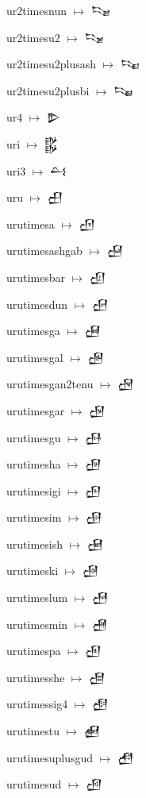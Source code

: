 {\noindent ur2timesnun $\mapsto$ {\cufont 𒌰}\par
\noindent ur2timesu2 $\mapsto$ {\cufont 𒌱}\par
\noindent ur2timesu2plusash $\mapsto$ {\cufont 𒌲}\par
\noindent ur2timesu2plusbi $\mapsto$ {\cufont 𒌳}\par
\noindent ur4 $\mapsto$ {\cufont 𒌴}\par
\noindent uri $\mapsto$ {\cufont 𒌵}\par
\noindent uri3 $\mapsto$ {\cufont 𒌶}\par
\noindent uru $\mapsto$ {\cufont 𒌷}\par
\noindent urutimesa $\mapsto$ {\cufont 𒌸}\par
\noindent urutimesashgab $\mapsto$ {\cufont 𒌹}\par
\noindent urutimesbar $\mapsto$ {\cufont 𒌺}\par
\noindent urutimesdun $\mapsto$ {\cufont 𒌻}\par
\noindent urutimesga $\mapsto$ {\cufont 𒌼}\par
\noindent urutimesgal $\mapsto$ {\cufont 𒌽}\par
\noindent urutimesgan2tenu $\mapsto$ {\cufont 𒌾}\par
\noindent urutimesgar $\mapsto$ {\cufont 𒌿}\par
\noindent urutimesgu $\mapsto$ {\cufont 𒍀}\par
\noindent urutimesha $\mapsto$ {\cufont 𒍁}\par
\noindent urutimesigi $\mapsto$ {\cufont 𒍂}\par
\noindent urutimesim $\mapsto$ {\cufont 𒍃}\par
\noindent urutimesish $\mapsto$ {\cufont 𒍄}\par
\noindent urutimeski $\mapsto$ {\cufont 𒍅}\par
\noindent urutimeslum $\mapsto$ {\cufont 𒍆}\par
\noindent urutimesmin $\mapsto$ {\cufont 𒍇}\par
\noindent urutimespa $\mapsto$ {\cufont 𒍈}\par
\noindent urutimesshe $\mapsto$ {\cufont 𒍉}\par
\noindent urutimessig4 $\mapsto$ {\cufont 𒍊}\par
\noindent urutimestu $\mapsto$ {\cufont 𒍋}\par
\noindent urutimesuplusgud $\mapsto$ {\cufont 𒍌}\par
\noindent urutimesud $\mapsto$ {\cufont 𒍍}\par
}
